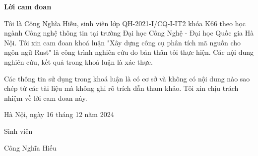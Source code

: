 \setcounter{page}{1}
\begin{center}
\textbf{\large{Lời cam đoan}	}
\end{center}
Tôi là Công Nghĩa Hiếu, sinh viên lớp QH-2021-I/CQ-I-IT2 khóa K66 theo học ngành Công nghệ thông tin tại trường Đại học Công Nghệ - Đại học Quốc gia Hà Nội. Tôi xin cam đoan khoá luận "Xây dựng công cụ phân tích mã nguồn cho ngôn ngữ Rust" là công trình nghiên cứu do bản thân tôi thực hiện. Các nội dung nghiên cứu, kết quả trong khoá luận là xác thực.

Các thông tin sử dụng trong khoá luận là có cơ sở và không có nội dung nào sao chép từ các tài liệu mà không ghi rõ trích dẫn tham khảo. Tôi xin chịu trách nhiệm về lời cam đoan này.

\begin{flushright}
Hà Nội, ngày 16 tháng 12 năm 2024
\end{flushright}

\begin{changemargin}{12cm}{2cm}
Sinh viên
\\[2cm]
\end{changemargin}

\begin{changemargin}{11cm}{2cm}
Công Nghĩa Hiếu
\end{changemargin}